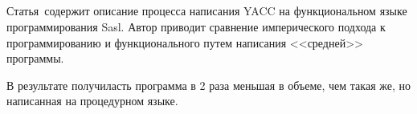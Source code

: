 \subsection{} \label{subsection_Jones1985}
Статья\,\cite{Jones1985} содержит описание процесса написания YACC на функциональном языке программирования Sasl. Автор приводит сравнение имперического подхода к программированию и функционального путем написания <<средней>> программы. 

В результате получиласть программа в 2 раза меньшая в объеме, чем такая же, но написанная на процедурном языке.

